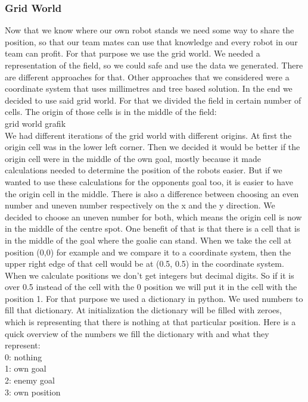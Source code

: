 \documentclass[lnicst,a4paper]{svmultln}
\begin{document}
\subsubsection{Grid World}
Now that we know where our own robot stands we need some way to share the position, so that our team mates can use that knowledge and every robot in our team can profit. For that purpose we use the grid world. We needed a representation of the field, so we could safe and use the data we generated. There are different approaches for that. Other approaches that we considered were a coordinate system that uses millimetres and tree based solution. In the end we decided to use said grid world. For that we divided the field in certain number of cells. The origin of those cells is in the middle of the field:\\
grid world grafik\\
We had different iterations of the grid world with different origins. At first the origin cell was in the lower left corner. Then we decided it would be better if the origin cell were in the middle of the own goal, mostly because it made calculations needed to determine the position of the robots easier. But if we wanted to use these calculations for the opponents goal too, it is easier to have the origin cell in the middle. There is also a difference between choosing an even number and uneven number respectively on the x and the y direction. We decided to choose an uneven number for both, which means the origin cell is now in the middle of the centre spot. One benefit of that is that there is a cell that is in the middle of the goal where the goalie can stand. When we take the cell at position (0,0) for example and we compare it to a coordinate system, then the upper right edge of that cell would be at (0.5, 0.5) in the coordinate system. When we calculate positions we don't get integers but decimal digits. So if it is over 0.5 instead of the cell with the 0 position we will put it in the cell with the position 1. 
For that purpose we used a dictionary in python. We used numbers to fill that dictionary. At initialization the dictionary will be filled with zeroes, which is representing that there is nothing at that particular position. Here is a quick overview of the numbers we fill the dictionary with and what they represent:\\
0: nothing\\
1: own goal\\
2: enemy goal\\
3: own position\\
\end{document}
